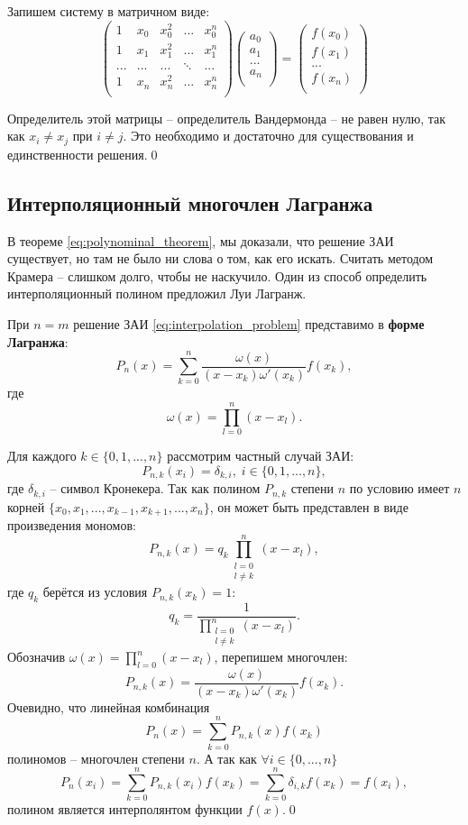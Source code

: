 \documentclass[../main.tex]{subfile}
\begin{document}
	Запишем систему в матричном виде:
	\[
	\begin{pmatrix}
		1	& x_0	& x_0^2	& ...	& x_0^n \\
		1	& x_1	& x_1^2	& ...	& x_1^n \\
		...	& ...	& ...	&\ddots	& ...	\\
		1	& x_n	& x_n^2	& ...	& x_n^n \\
	\end{pmatrix}
	\begin{pmatrix}
		a_0 \\
		a_1 \\
		... \\
		a_n \\
	\end{pmatrix}
	=
	\begin{pmatrix}
		f(x_0)	\\
		f(x_1)	\\
		...	\\
		f(x_n)	\\
	\end{pmatrix}
	\]

	Определитель этой матрицы -- определитель Вандермонда -- не равен нулю,
	так как $x_i\ne x_j$ при $i\ne j$. Это необходимо и достаточно для
	существования и единственности решения.\qed

\subsection{Интерполяционный многочлен Лагранжа}
В теореме \eqref{eq:polynominal_theorem}, мы доказали, что решение ЗАИ
существует, но там не было ни слова о том, как его искать. Считать методом
Крамера -- слишком долго, чтобы не наскучило. Один из способ определить
интерполяционный полином предложил Луи Лагранж.

\begin{theorem}\label{eq:lagrange_polynomial}
	При $n=m$ решение ЗАИ \eqref{eq:interpolation_problem} представимо в
	\textbf{форме Лагранжа}:
	\[P_n(x)=\sum_{k=0}^{n}\frac{\omega(x)}{(x-x_k)\omega'(x_k)}f(x_k),\]
	где
	\[\omega(x)=\prod_{l=0}^{n}(x-x_l).\]
\end{theorem}

\beginproof

	Для каждого $k\in\{0,1,...,n\}$ рассмотрим частный случай ЗАИ:
	\[P_{n,k}(x_i)=\delta_{k,i},\;i\in\{0,1,...,n\},\]
	где $\delta_{k,i}$ -- символ Кронекера. Так как полином $P_{n,k}$
	степени $n$ по условию имеет $n$ корней $\{x_0, x_1, ..., x_{k-1},
	x_{k+1}, ..., x_n\}$, он может быть представлен в виде произведения
	мономов:
	\[P_{n,k}(x)=q_k\prod_{\substack{l=0\\ l\neq k}}^{n}(x-x_l),\]
	где $q_k$ берётся из условия $P_{n,k}(x_k)=1$:
	\[q_k=\frac{1}{\prod_{\substack{l=0\\ l\neq k}}^{n}(x-x_l)}.\]
	Обозначив $\omega(x)=\prod_{l=0}^{n}(x-x_l)$, перепишем многочлен:
	\[P_{n,k}(x)=\frac{\omega(x)}{(x-x_k)\omega'(x_k)}f(x_k).\]
	Очевидно, что линейная комбинация
	\[P_n(x)=\sum_{k=0}^{n}P_{n,k}(x)f(x_k)\]
	полиномов -- многочлен степени $n$. А так как $\forall i\in\{0,...,n\}$
	\[P_n(x_i)=\sum_{k=0}^{n}P_{n,k}(x_i)f(x_k)=\sum_{k=0}^{n}\delta_{i,k}
	f(x_k)=f(x_i),\]
	полином является интерполянтом функции $f(x)$.\qed
\end{document}
